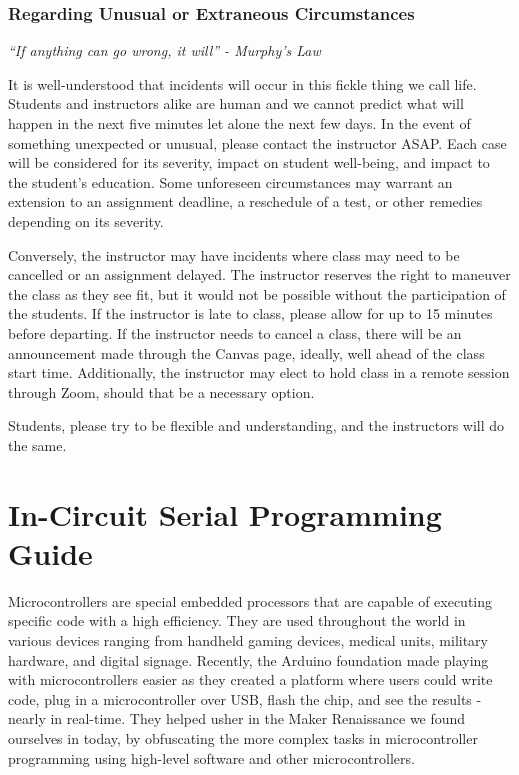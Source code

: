     \subsection*{Regarding Unusual or Extraneous Circumstances}
    \emph{``If anything can go wrong, it will'' - Murphy's Law}

    It is well-understood that incidents will occur in this fickle thing we call life.
    Students and instructors alike are human and we cannot predict what will happen in the next five minutes let alone the next few days.
    In the event of something unexpected or unusual, please contact the instructor ASAP.
    Each case will be considered for its severity, impact on student well-being, and impact to the student's education.
    Some unforeseen circumstances may warrant an extension to an assignment deadline, a reschedule of a test, or other remedies depending on its severity.
    
    Conversely, the instructor may have incidents where class may need to be cancelled or an assignment delayed. The instructor reserves the right to maneuver the class as they see fit, but it would not be possible without the participation of the students.
    If the instructor is late to class, please allow for up to 15 minutes before departing.
    If the instructor needs to cancel a class, there will be an announcement made through the Canvas page, ideally, well ahead of the class start time.
    Additionally, the instructor may elect to hold class in a remote session through Zoom, should that be a necessary option.
    
    Students, please try to be flexible and understanding, and the instructors will do the same.





\chapter{In-Circuit Serial Programming Guide}

Microcontrollers are special embedded processors that are capable of executing specific code with a high efficiency.
They are used throughout the world in various devices ranging from handheld gaming devices, medical units, military 
hardware, and digital signage. Recently, the Arduino foundation made playing with microcontrollers easier as they
created a platform where users could write code, plug in a microcontroller over USB, flash the chip, and see the results
- nearly in real-time. They helped usher in the Maker Renaissance we found ourselves in today, by obfuscating the more
complex tasks in microcontroller programming using high-level software and other microcontrollers.

